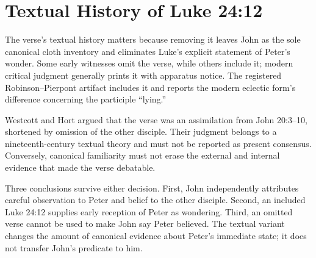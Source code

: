\section{Textual History of Luke 24:12}

The verse's textual history matters because removing it leaves John as the sole
canonical cloth inventory and eliminates Luke's explicit statement of Peter's
wonder. Some early witnesses omit the verse, while others include it; modern
critical judgment generally prints it with apparatus notice. The registered
Robinson--Pierpont artifact includes it and reports the modern eclectic form's
difference concerning the participle ``lying.''

Westcott and Hort argued that the verse was an assimilation from John
20:3--10, shortened by omission of the other disciple. Their judgment belongs
to a nineteenth-century textual theory and must not be reported as present
consensus. Conversely, canonical familiarity must not erase the external and
internal evidence that made the verse debatable.

Three conclusions survive either decision. First, John independently attributes
careful observation to Peter and belief to the other disciple. Second, an
included Luke 24:12 supplies early reception of Peter as wondering. Third, an
omitted verse cannot be used to make John say Peter believed. The textual
variant changes the amount of canonical evidence about Peter's immediate state;
it does not transfer John's predicate to him.

